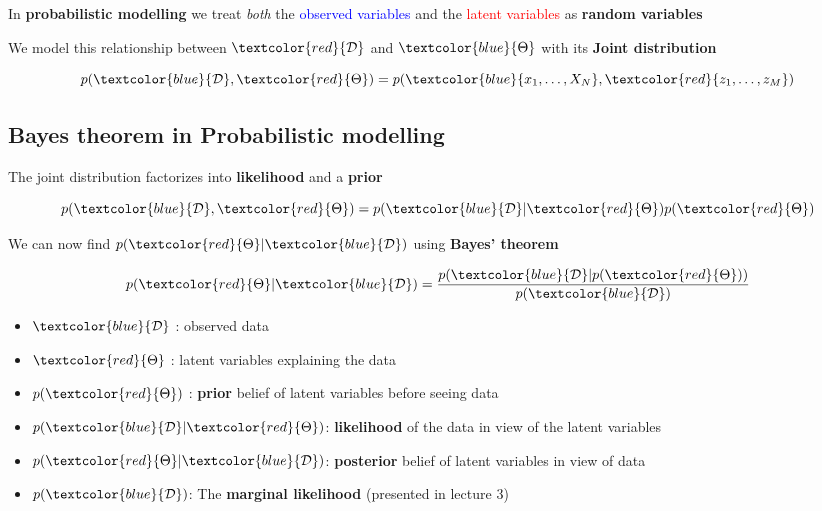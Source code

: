 \begin{wbox}{}
    In \textbf{probabilistic modelling} we treat \emph{both} the \textcolor{blue}{observed variables} and the \textcolor{red}{latent variables} as \textbf{random variables} 
\end{wbox}


We model this relationship between $\textcolor{red}{\mathcal{D}}$ and $\textcolor{blue}{\Theta}$ with its \textbf{Joint distribution}

\begin{equation}
    p(\textcolor{blue}{\mathcal{D}}, \textcolor{red}{\Theta}) = p(\textcolor{blue}{x_1, \dots, X_N},\textcolor{red}{z_1, \dots, z_M})
\end{equation}


\subsection{Bayes theorem in Probabilistic modelling}
The joint distribution factorizes into \textbf{likelihood} and a \textbf{prior}

\begin{equation}
    p(\textcolor{blue}{\mathcal{D}}, \textcolor{red}{\Theta}) = p(\textcolor{blue}{\mathcal{D}}|\textcolor{red}{\Theta})p(\textcolor{red}{\Theta}) 
\end{equation}

We can now find $p(\textcolor{red}{\Theta} | \textcolor{blue}{\mathcal{D}})$ using \textbf{Bayes' theorem}

\begin{equation}
    p(\textcolor{red}{\Theta} | \textcolor{blue}{\mathcal{D}}) = \frac{p(\textcolor{blue}{\mathcal{D}}|p(\textcolor{red}{\Theta}))} {p(\textcolor{blue}{\mathcal{D}})} 
\end{equation}


\begin{definition}{}
\begin{itemize}
    \item $\textcolor{blue}{\mathcal{D}}$ : observed data
    \item $\textcolor{red}{\Theta}$ : latent variables explaining the data 
    \item $p(\textcolor{red}{\Theta})$ : \textbf{prior} belief of latent variables before seeing data
    \item $p(\textcolor{blue}{\mathcal{D}}|\textcolor{red}{\Theta})$: \textbf{likelihood} of the data in view of the latent variables
    \item $p(\textcolor{red}{\Theta}|\textcolor{blue}{\mathcal{D}})$: \textbf{posterior} belief of latent variables in view of data 
    \item $p(\textcolor{blue}{\mathcal{D}})$: The \textbf{marginal likelihood} (presented in lecture 3)
\end{itemize}
\end{definition}

